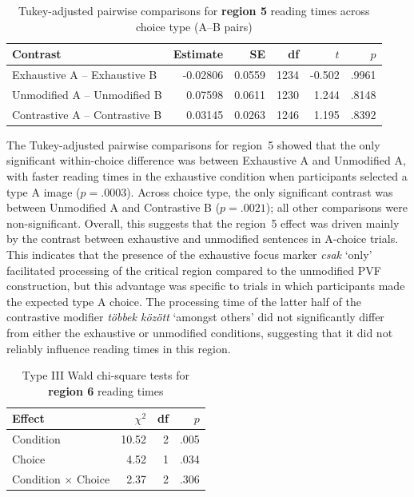 \documentclass[a4paper, ruler]{CUP-JNL-LIN}%
\begin{document}
\begin{table}[htbp]
\centering
\caption{Tukey-adjusted pairwise comparisons for \textbf{region 5} reading times across choice type (A--B pairs)}
\label{tab:r5-pairwise-across-choice}
\begin{tabularx}{\textwidth}{@{}Xrrrrr@{}}
\toprule
Contrast & Estimate & SE & df & $t$ & $p$ \\
\midrule
Exhaustive A -- Exhaustive B   & -0.02806 & 0.0559 & 1234 & -0.502 & .9961 \\
Unmodified A -- Unmodified B   &  0.07598 & 0.0611 & 1230 &  1.244 & .8148 \\
Contrastive A -- Contrastive B &  0.03145 & 0.0263 & 1246 &  1.195 & .8392 \\
\bottomrule
\end{tabularx}
\end{table}

The Tukey-adjusted pairwise comparisons for region~5 showed that the only significant within-choice difference was between Exhaustive A and Unmodified A, with faster reading times in the exhaustive condition when participants selected a type A image ($p=.0003$). Across choice type, the only significant contrast was between Unmodified A and Contrastive B ($p=.0021$); all other comparisons were non-significant. Overall, this suggests that the region~5 effect was driven mainly by the contrast between exhaustive and unmodified sentences in A-choice trials. This indicates that the presence of the exhaustive focus marker \textit{csak} `only' facilitated processing of the critical region compared to the unmodified PVF construction, but this advantage was specific to trials in which participants made the expected type A choice. The processing time of the latter half of the contrastive modifier \textit{többek között} `amongst others' did not significantly differ from either the exhaustive or unmodified conditions, suggesting that it did not reliably influence reading times in this region. 


\begin{table}[htbp]
\centering
\caption{Type III Wald chi-square tests for \textbf{region 6} reading times}
\label{tab:r6}
\begin{tabularx}{\textwidth}{@{}Xrrr@{}}
\toprule
Effect & $\chi^2$ & df & $p$ \\
\midrule
Condition & 10.52 & 2 & .005 \\
Choice & 4.52 & 1 & .034 \\
Condition $\times$ Choice & 2.37 & 2 & .306 \\
\bottomrule
\end{tabularx}
\end{table}
\end{document}
